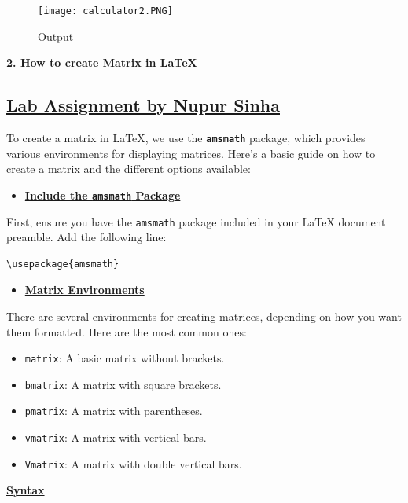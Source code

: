 \documentclass{article}
\begin{document}
\vspace{1.3cm}

\begin{figure}[h!]
    \centering
    \texttt{[image: calculator2.PNG]}
    \caption{Output}
\end{figure}

\newpage

\begin{center}
    \LARGE{\textbf{2. \underline{How to create Matrix in LaTeX}}}
\end{center}
\vspace{0.2cm}
 \begin{center}
     \section*{\underline{Lab Assignment by Nupur Sinha}}
\end{center}
\LARGE{To create a matrix in LaTeX, we use the \texttt{\textbf{amsmath}} package, which provides various environments for displaying matrices. Here’s a basic guide on how to create a matrix and the different options available:}
\vspace{0.1cm}
\begin{center}
\begin{itemize}
    \item{\underline{\textbf{Include the \texttt{amsmath} Package}}}
\end{itemize} 
\end{center}
First, ensure you have the \texttt{amsmath} package included in your LaTeX document preamble. Add the following line:
\begin{verbatim}
\usepackage{amsmath}
\end{verbatim}
\begin{center}
    \begin{itemize}
        \item {\textbf{\underline{Matrix Environments}}}
    \end{itemize}
\end{center}
\LARGE{
There are several environments for creating matrices, depending on how you want them formatted. Here are the most common ones:}

\begin{itemize}
  \item \texttt{matrix}: A basic matrix without brackets.
  \item \texttt{bmatrix}: A matrix with square brackets.
  \item \texttt{pmatrix}: A matrix with parentheses.
  \item \texttt{vmatrix}: A matrix with vertical bars.
  \item \texttt{Vmatrix}: A matrix with double vertical bars.
\end{itemize}
\begin{center}
        \item {\textbf{\underline{\LARGE{Syntax}}}}
\end{center}
\end{document}
